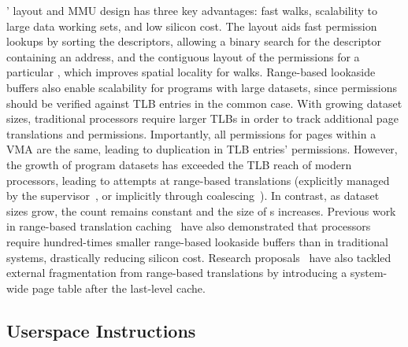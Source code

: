 \seccells' \ptable layout and MMU design has three
key advantages: fast \ptable walks, scalability to large data 
working sets, and low silicon cost.
The \ptable layout aids fast permission lookups by
sorting the \cell descriptors, allowing a binary search
for the \cell descriptor containing an address, 
and the contiguous layout of the permissions for a particular
\secdiv, which improves spatial locality for \ptable walks.
Range-based lookaside buffers also enable scalability for
programs with large datasets, since permissions should be 
verified against TLB entries in the common case.
With growing dataset sizes, traditional processors require larger 
TLBs in order to track additional page translations and permissions.
Importantly, all permissions for pages within a VMA are
the same, leading to duplication in TLB entries' permissions.
However, the growth of program datasets has exceeded the
TLB reach of modern processors, leading to attempts at 
range-based translations (explicitly managed by the 
supervisor~\cite{YanLNB19}, or implicitly through 
coalescing~\cite{PhamVJB12}).
In contrast, as dataset sizes grow, the \cell count remains 
constant and the size of \cell{}s increases.
Previous work in range-based translation caching~\cite{YanLNB19,0003BOBFP21midgard} 
have also demonstrated that 
processors require hundred-times smaller range-based lookaside buffers 
than in traditional systems, drastically reducing silicon cost.
Research proposals~\cite{0003BOBFP21midgard, ZhangSRL10} 
have also tackled
external fragmentation from range-based translations 
by introducing a system-wide page table after the
last-level cache.

\subsection{Userspace Instructions}
\label{sec:design:instructions}

